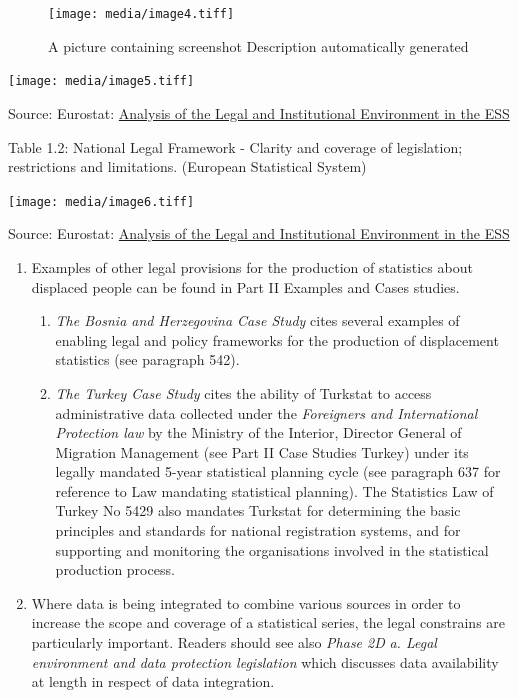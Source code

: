 \documentclass[
]{article}
\begin{document}
\begin{figure}
\centering
\texttt{[image: media/image4.tiff]}
\caption{A picture containing screenshot Description automatically
generated}
\end{figure}

\texttt{[image: media/image5.tiff]}

Source: Eurostat: \href{https://ec.europa.eu/eurostat/cros/system/files/admin-wp1.1_analysis_legal_institutional_environment_final.pdf}{Analysis of the Legal and Institutional Environment
in the
ESS}

Table 1.2: National Legal Framework - Clarity and coverage of
legislation; restrictions and limitations. (European Statistical System)

\texttt{[image: media/image6.tiff]}

Source: Eurostat: \href{https://ec.europa.eu/eurostat/cros/system/files/admin-wp1.1_analysis_legal_institutional_environment_final.pdf}{Analysis of the Legal and Institutional Environment
in the
ESS}

\begin{enumerate}
\def\labelenumi{\arabic{enumi}.}
\setcounter{enumi}{57}
\item
  Examples of other legal provisions for the production of statistics
  about displaced people can be found in Part II Examples and Cases
  studies.

  \begin{enumerate}
  \def\labelenumii{\arabic{enumii}.}
  \setcounter{enumii}{5}
  \item
    \emph{The Bosnia and Herzegovina Case Study} cites several examples
    of enabling legal and policy frameworks for the production of
    displacement statistics (see paragraph 542).
  \item
    \emph{The Turkey Case Study} cites the ability of Turkstat to access
    administrative data collected under the \emph{Foreigners and
    International Protection law} by the Ministry of the Interior,
    Director General of Migration Management (see Part II Case
    Studies Turkey) under its legally mandated 5-year statistical
    planning cycle (see paragraph 637 for reference to Law mandating
    statistical planning). The Statistics Law of Turkey No 5429 also
    mandates Turkstat for determining the basic principles and
    standards for national registration systems, and for supporting
    and monitoring the organisations involved in the statistical
    production process.
  \end{enumerate}
\item
  Where data is being integrated to combine various sources in order
  to increase the scope and coverage of a statistical series, the
  legal constrains are particularly important. Readers should see also
  \emph{Phase 2D} \emph{a. Legal environment and data protection legislation}
  which discusses data availability at length in respect of data
  integration.
\end{enumerate}
\end{document}
